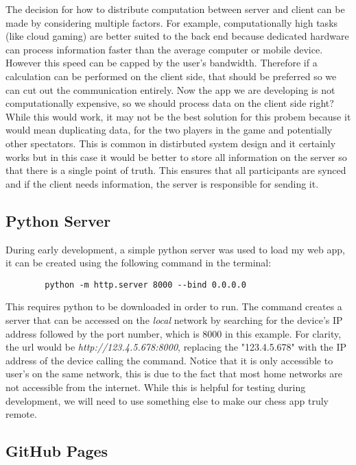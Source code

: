 The decision for how to distribute computation between server and client can be made by considering multiple factors. For example, computationally high tasks (like cloud gaming) are better suited to the back end because dedicated hardware can process information faster than the average computer or mobile device. However this speed can be capped by the user's bandwidth. Therefore if a calculation can be performed on the client side, that should be preferred so we can cut out the communication entirely. Now the app we are developing is not computationally expensive, so we should process data on the client side right? While this would work, it may not be the best solution for this probem because it would mean duplicating data, for the two players in the game and potentially other spectators. This is common in distirbuted system design and it certainly works but in this case it would be better to store all information on the server so that there is a single point of truth. This ensures that all participants are synced and if the client needs information, the server is responsible for sending it.

\subsection{Python Server}
\label{PythonServer}

During early development, a simple python server was used to load my web app, it can be created using the following command in the terminal:
\begin{center}
    \begin{lstlisting}
        python -m http.server 8000 --bind 0.0.0.0
    \end{lstlisting}
\end{center}
This requires python to be downloaded in order to run. The command creates a server that can be accessed on the \emph{local} network by searching for the device's IP address followed by the port number, which is 8000 in this example. For clarity, the url would be \emph{http://123.4.5.678:8000}, replacing the "123.4.5.678" with the IP address of the device calling the command. Notice that it is only accessible to user's on the same network, this is due to the fact that most home networks are not accessible from the internet. While this is helpful for testing during development, we will need to use something else to make our chess app truly remote.

\subsection{GitHub Pages}
\label{GitHubPages}

